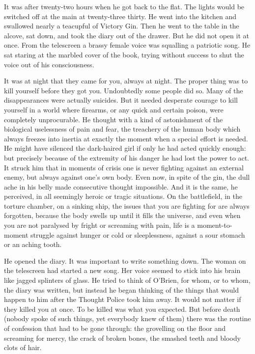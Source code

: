 \documentclass{article}
\begin{document}
It was after twenty-two hours when he got back to the flat. The lights
would be switched off at the main at twenty-three thirty. He went into the
kitchen and swallowed nearly a teacupful of Victory Gin. Then he went to
the table in the alcove, sat down, and took the diary out of the drawer.
But he did not open it at once. From the telescreen a brassy female voice
was squalling a patriotic song. He sat staring at the marbled cover of the
book, trying without success to shut the voice out of his consciousness.

It was at night that they came for you, always at night. The proper thing
was to kill yourself before they got you. Undoubtedly some people did so.
Many of the disappearances were actually suicides. But it needed desperate
courage to kill yourself in a world where firearms, or any quick and
certain poison, were completely unprocurable. He thought with a kind of
astonishment of the biological uselessness of pain and fear, the treachery
of the human body which always freezes into inertia at exactly the moment
when a special effort is needed. He might have silenced the dark-haired
girl if only he had acted quickly enough: but precisely because of the
extremity of his danger he had lost the power to act. It struck him that
in moments of crisis one is never fighting against an external enemy, but
always against one's own body. Even now, in spite of the gin, the dull
ache in his belly made consecutive thought impossible. And it is the same,
he perceived, in all seemingly heroic or tragic situations. On the
battlefield, in the torture chamber, on a sinking ship, the issues that
you are fighting for are always forgotten, because the body swells up until
it fills the universe, and even when you are not paralysed by fright or
screaming with pain, life is a moment-to-moment struggle against hunger or
cold or sleeplessness, against a sour stomach or an aching tooth.

He opened the diary. It was important to write something down. The woman
on the telescreen had started a new song. Her voice seemed to stick into
his brain like jagged splinters of glass. He tried to think of O'Brien,
for whom, or to whom, the diary was written, but instead he began thinking
of the things that would happen to him after the Thought Police took him
away. It would not matter if they killed you at once. To be killed was
what you expected. But before death (nobody spoke of such things, yet
everybody knew of them) there was the routine of confession that had to
be gone through: the grovelling on the floor and screaming for mercy, the
crack of broken bones, the smashed teeth and bloody clots of hair.
\end{document}

